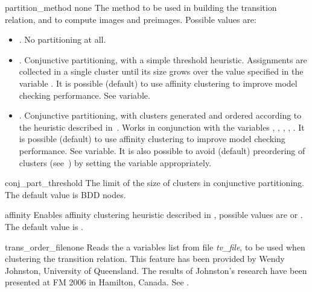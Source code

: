 \begin{nusmvVar} {partition\_method}
{} {none} The method to
be used in building the transition relation, and to compute images and
preimages. Possible values are:

\begin{itemize}
\item {}. No partitioning at all.

\item {}. Conjunctive partitioning, with a simple
threshold heuristic. Assignments are collected in a single cluster
until its size grows over the value specified in the variable
. It is possible (default) to use affinity
clustering to improve model checking performance. See
 variable.

\item {}. Conjunctive partitioning, with clusters 
generated and ordered according to the heuristic described
in~\cite{RAP+95}. Works in conjunction with the variables
,
, , , .
It is possible (default) to use affinity clustering to improve model 
checking performance. See  variable. It is also possible
to avoid (default) preordering of clusters (see~\cite{RAP+95}) by
setting the  variable appropriately.
\end{itemize}

\end{nusmvVar}

\begin{nusmvVar}{conj\_part\_threshold}{}{}
The limit of the size of clusters in conjunctive partitioning. The
default value is  BDD nodes.
\end{nusmvVar}

\begin{nusmvVar} {affinity}{}{}
Enables affinity clustering heuristic described in \cite{MOON00},
possible values are  or . The default value is .
\end{nusmvVar}

\begin{nusmvVar} {trans\_order\_file}{}{none}
Reads the a variables list from file {\it tv\_file}, to be used when
clustering the transition relation.  This feature has been provided by
Wendy Johnston, University of Queensland. The results of Johnston's
research have been presented at FM 2006 in Hamilton, Canada. See
\cite{fm06}.
\end{nusmvVar}

